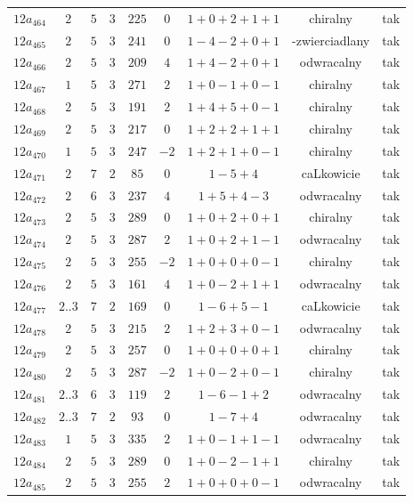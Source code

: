 \begin{longtable}{ccccccccc}
$12a_{464}$ & $2$ & $5$ & $3$ & $225$ & $0$ & $1+0+2+1+1$ & chiralny & tak \\
$12a_{465}$ & $2$ & $5$ & $3$ & $241$ & $0$ & $1-4-2+0+1$ & -zwierciadlany & tak \\
$12a_{466}$ & $2$ & $5$ & $3$ & $209$ & $4$ & $1+4-2+0+1$ & odwracalny & tak \\
$12a_{467}$ & $1$ & $5$ & $3$ & $271$ & $2$ & $1+0-1+0-1$ & chiralny & tak \\
$12a_{468}$ & $2$ & $5$ & $3$ & $191$ & $2$ & $1+4+5+0-1$ & chiralny & tak \\
$12a_{469}$ & $2$ & $5$ & $3$ & $217$ & $0$ & $1+2+2+1+1$ & chiralny & tak \\
$12a_{470}$ & $1$ & $5$ & $3$ & $247$ & $-2$ & $1+2+1+0-1$ & chiralny & tak \\
$12a_{471}$ & $2$ & $7$ & $2$ & $85$ & $0$ & $1-5+4$ & caLkowicie & tak \\
$12a_{472}$ & $2$ & $6$ & $3$ & $237$ & $4$ & $1+5+4-3$ & odwracalny & tak \\
$12a_{473}$ & $2$ & $5$ & $3$ & $289$ & $0$ & $1+0+2+0+1$ & chiralny & tak \\
$12a_{474}$ & $2$ & $5$ & $3$ & $287$ & $2$ & $1+0+2+1-1$ & odwracalny & tak \\
$12a_{475}$ & $2$ & $5$ & $3$ & $255$ & $-2$ & $1+0+0+0-1$ & chiralny & tak \\
$12a_{476}$ & $2$ & $5$ & $3$ & $161$ & $4$ & $1+0-2+1+1$ & odwracalny & tak \\
$12a_{477}$ & $2..3$ & $7$ & $2$ & $169$ & $0$ & $1-6+5-1$ & caLkowicie & tak \\
$12a_{478}$ & $2$ & $5$ & $3$ & $215$ & $2$ & $1+2+3+0-1$ & odwracalny & tak \\
$12a_{479}$ & $2$ & $5$ & $3$ & $257$ & $0$ & $1+0+0+0+1$ & chiralny & tak \\
$12a_{480}$ & $2$ & $5$ & $3$ & $287$ & $-2$ & $1+0-2+0-1$ & chiralny & tak \\
$12a_{481}$ & $2..3$ & $6$ & $3$ & $119$ & $2$ & $1-6-1+2$ & odwracalny & tak \\
$12a_{482}$ & $2..3$ & $7$ & $2$ & $93$ & $0$ & $1-7+4$ & odwracalny & tak \\
$12a_{483}$ & $1$ & $5$ & $3$ & $335$ & $2$ & $1+0-1+1-1$ & odwracalny & tak \\
$12a_{484}$ & $2$ & $5$ & $3$ & $289$ & $0$ & $1+0-2-1+1$ & chiralny & tak \\
$12a_{485}$ & $2$ & $5$ & $3$ & $255$ & $2$ & $1+0+0+0-1$ & odwracalny & tak \\

\end{longtable}
